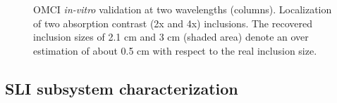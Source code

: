 \begin{figure}[]
    \begin{center}
    \end{center}
    \caption{\ac{OMCI} \textit{in-vitro} validation at two wavelengths (columns). Localization of two absorption contrast (2x and 4x) inclusions. The recovered inclusion sizes of 2.1 cm and 3 cm (shaded area) denote an over estimation of about 0.5 cm with respect to the real inclusion size.} 
    \label{fig:PhantomResults}
\end{figure} 



\subsection{SLI subsystem characterization}


